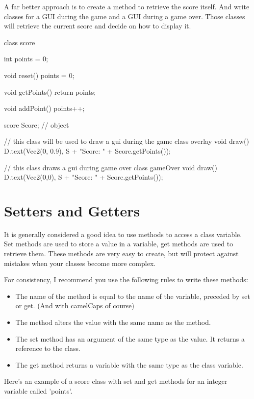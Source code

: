 A far better approach is to create a method to retrieve the score itself. And write classes for a GUI during the game and a GUI during a game over. Those classes will retrieve the current score and decide on how to display it.

\begin{code}
class score {
  int points = 0;
  
  void reset() {
    points = 0;
  }
  
  void getPoints() {
    return points;
  }
  
  void addPoint() {
    points++;
  }
}

score Score; // object

// this class will be used to draw a gui during the game
class overlay {
  void draw() {
    D.text(Vec2(0, 0.9), S + "Score: " + Score.getPoints());
  }
}

// this class draws a gui during game over
class gameOver {
  void draw() {
    D.text(Vec2(0,0), S + "Score: " + Score.getPoints());
  } 
}
\end{code}

\section{Setters and Getters}

It is generally considered a good idea to use methods to access a class variable. Set methods are used to store a value in a variable, get methods are used to retrieve them. These methods are very easy to create, but will protect against mistakes when your classes become more complex.

For consistency, I recommend you use the following rules to write these methods:

\begin{itemize}
\item The name of the method is equal to the name of the variable, preceded by set or get. (And with camelCaps of course)
\item The method alters the value with the same name as the method.
\item The set method has an argument of the same type as the value. It returns a reference to the class.
\item The get method returns a variable with the same type as the class variable.
\end{itemize}

Here's an example of a score class with set and get methods for an integer variable called 'points'.

